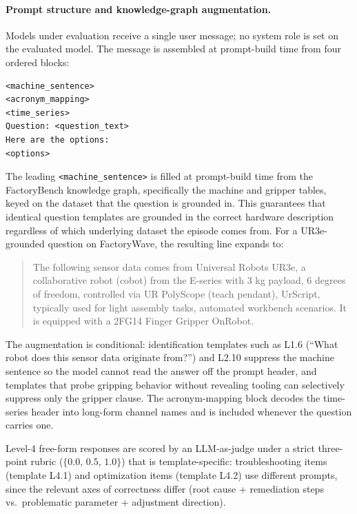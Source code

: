 \documentclass{article}
\begin{document}
\paragraph{Prompt structure and knowledge-graph augmentation.}
Models under evaluation receive a single user message; no system role is set on the evaluated model. The message is assembled at prompt-build time from four ordered blocks:

\begin{verbatim}
<machine_sentence>
<acronym_mapping>
<time_series>
Question: <question_text>
Here are the options:
<options>
\end{verbatim}

\noindent The leading \texttt{<machine\_sentence>} is filled at prompt-build time from the FactoryBench knowledge graph, specifically the machine and gripper tables, keyed on the dataset that the question is grounded in. This guarantees that identical question templates are grounded in the correct hardware description regardless of which underlying dataset the episode comes from. For a UR3e-grounded question on FactoryWave, the resulting line expands to:

\begin{quote}\small
    The following sensor data comes from Universal Robots UR3e, a collaborative robot (cobot) from the E-series with 3 kg payload, 6 degrees of freedom, controlled via UR PolyScope (teach pendant), UrScript, typically used for light assembly tasks, automated workbench scenarios. It is equipped with a 2FG14 Finger Gripper OnRobot.
\end{quote}

\noindent The augmentation is conditional: identification templates such as L1.6 (``What robot does this sensor data originate from?'') and L2.10 suppress the machine sentence so the model cannot read the answer off the prompt header, and templates that probe gripping behavior without revealing tooling can selectively suppress only the gripper clause. The acronym-mapping block decodes the time-series header into long-form channel names and is included whenever the question carries one.

Level-4 free-form responses are scored by an LLM-as-judge under a strict three-point rubric ($\{0.0,\,0.5,\,1.0\}$) that is template-specific: troubleshooting items (template L4.1) and optimization items (template L4.2) use different prompts, since the relevant axes of correctness differ (root cause + remediation steps vs.\ problematic parameter + adjustment direction).
\end{document}
